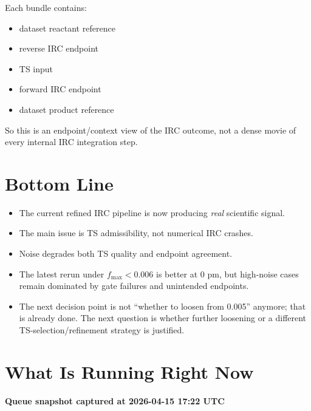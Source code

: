\documentclass[11pt]{article}
\begin{document}
Each bundle contains:
\begin{itemize}[nosep,leftmargin=1.5em]
\item dataset reactant reference
\item reverse IRC endpoint
\item TS input
\item forward IRC endpoint
\item dataset product reference
\end{itemize}

So this is an endpoint/context view of the IRC outcome, not a dense movie of every
internal IRC integration step.

\section*{Bottom Line}

\begin{itemize}[nosep,leftmargin=1.5em]
\item The current refined IRC pipeline is now producing \emph{real} scientific signal.
\item The main issue is TS admissibility, not numerical IRC crashes.
\item Noise degrades both TS quality and endpoint agreement.
\item The latest rerun under \(f_{\max}<0.006\) is better at 0 pm, but high-noise
      cases remain dominated by gate failures and unintended endpoints.
\item The next decision point is not ``whether to loosen from 0.005'' anymore;
      that is already done. The next question is whether further loosening or a
      different TS-selection/refinement strategy is justified.
\end{itemize}

\section*{What Is Running Right Now}

\textbf{Queue snapshot captured at 2026-04-15 17:22 UTC}
\end{document}

